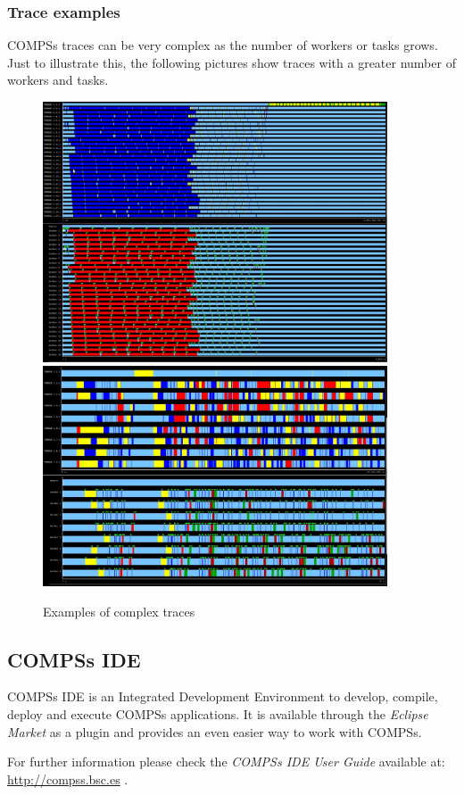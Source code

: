 \subsubsection{Trace examples}
COMPSs traces can be very complex as the number of workers or tasks grows. Just to illustrate this, the following 
pictures show traces with a greater number of workers and tasks.

\begin{figure}[ht!]
  \centering
    \includegraphics[width=0.91\textwidth]{./Sections/4_Tools/Figures/trace_example1.jpeg}
    \includegraphics[width=0.91\textwidth]{./Sections/4_Tools/Figures/trace_example2.jpeg}
    \caption{Examples of complex traces}
\end{figure}

\newpage
\subsection{COMPSs IDE}
\label{subsec:IDE}
COMPSs IDE is an Integrated Development Environment to develop, compile, deploy and execute COMPSs applications. It is available
through the \textit{Eclipse Market} as a plugin and provides an even easier way to work with COMPSs.

For further information please check the \textit{COMPSs IDE User Guide} available at: \url{http://compss.bsc.es} .
